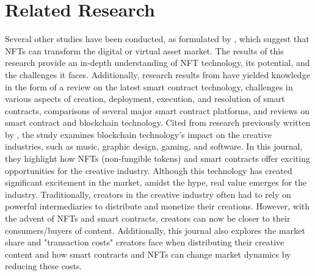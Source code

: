 \section{Related Research}
\label{sec:penelitianterkait}



Several other studies have been conducted, as formulated by \citet{Wang2021}, which suggest that NFTs can transform the digital or virtual asset market. The results of this research provide an in-depth understanding of NFT technology, its potential, and the challenges it faces. Additionally, research results from \citet{Zheng2020} have yielded knowledge in the form of a review on the latest smart contract technology, challenges in various aspects of creation, deployment, execution, and resolution of smart contracts, comparisons of several major smart contract platforms, and reviews on smart contract and blockchain technology. Cited from research previously written by \citet{Malik2023}, the study examines blockchain technology's impact on the creative industries, such as music, graphic design, gaming, and software. In this journal, they highlight how NFTs (non-fungible tokens) and smart contracts offer exciting opportunities for the creative industry. Although this technology has created significant excitement in the market, amidst the hype, real value emerges for the industry. Traditionally, creators in the creative industry often had to rely on powerful intermediaries to distribute and monetize their creations. However, with the advent of NFTs and smart contracts, creators can now be closer to their consumers/buyers of content. Additionally, this journal also explores the market share and "transaction costs" creators face when distributing their creative content and how smart contracts and NFTs can change market dynamics by reducing these costs.